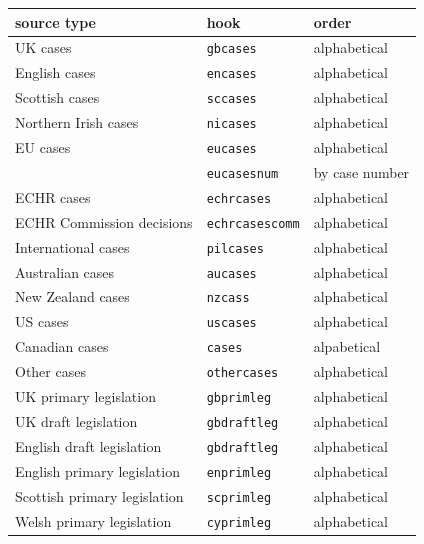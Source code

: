 \documentclass[a4paper,
               11pt,
	       DIV=1,			   
	       footinclude=false]
	      {scrartcl}
\begin{document}
\begin{table}
\centering
\small
{}
\begin{tabular}{lll}
\toprule
source type                          & hook                  & order \\
\midrule
UK cases                             & \texttt{gbcases}      & alphabetical\\
English cases                        & \texttt{encases}      & alphabetical\\
Scottish cases                       & \texttt{sccases}      & alphabetical\\
Northern Irish cases                 & \texttt{nicases}      & alphabetical\\
EU cases                             & \texttt{eucases}      & alphabetical \\
                                     & \texttt{eucasesnum}   & by case number \\
ECHR cases                           & \texttt{echrcases}     & alphabetical \\
ECHR Commission decisions            & \texttt{echrcasescomm}& alphabetical \\
International cases                  & \texttt{pilcases}     & alphabetical \\
Australian cases					 & \texttt{aucases}      & alphabetical \\
New Zealand cases                    & \texttt{nzcass}       & alphabetical \\
US cases                             & \texttt{uscases}      & alphabetical \\
Canadian cases                       & \texttt{cases}        & alpabetical \\
Other cases                          & \texttt{othercases}   & alphabetical \\
UK primary legislation               & \texttt{gbprimleg}    & alphabetical \\
UK draft legislation                 & \texttt{gbdraftleg}   & alphabetical \\
English draft legislation            & \texttt{gbdraftleg}   & alphabetical \\
English primary legislation          & \texttt{enprimleg}    & alphabetical \\
Scottish primary legislation         & \texttt{scprimleg}    & alphabetical \\
Welsh primary legislation            & \texttt{cyprimleg}    & alphabetical \\

\end{tabular}
\end{table}
\end{document}
